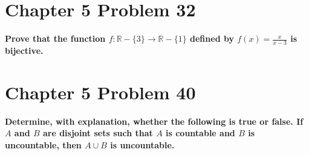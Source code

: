 \documentclass[10pt]{article}
\begin{document}
\section{Chapter 5 Problem 32}
\textbf{Prove that the function $f: \mathbb{R} - \{3\} \to \mathbb{R} - \{1\}$ defined by $f(x) = \frac{x}{x-3}$ is bijective.}



\section{Chapter 5 Problem 40}
\textbf{Determine, with explanation, whether the following is true or false.  If $A$ and $B$ are disjoint sets such that $A$ is countable
and $B$ is uncountable, then $A \cup B$ is uncountable.}
\end{document}
